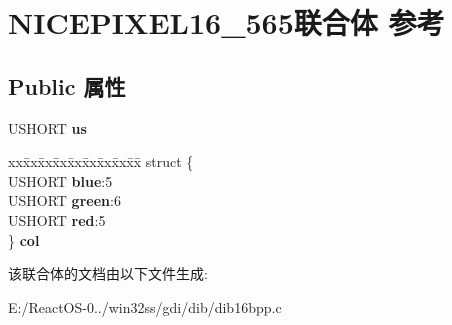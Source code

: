 \hypertarget{union_n_i_c_e_p_i_x_e_l16__565}{}\section{N\+I\+C\+E\+P\+I\+X\+E\+L16\+\_\+565联合体 参考}
\label{union_n_i_c_e_p_i_x_e_l16__565}
\subsection*{Public 属性}
\begin{DoxyCompactItemize}
\item 
\mbox{\label{union_n_i_c_e_p_i_x_e_l16__565_ac82d3017de59cd7a8bbcac3c68549e73}} 
U\+S\+H\+O\+RT {\bfseries us}
\item 
\mbox{\label{union_n_i_c_e_p_i_x_e_l16__565_a875b4cc5156e71ec103db30b4d67b190}} 
\begin{tabbing}
xx\=xx\=xx\=xx\=xx\=xx\=xx\=xx\=xx\=\kill
struct \{\\
\>USHORT {\bfseries blue}:5\\
\>USHORT {\bfseries green}:6\\
\>USHORT {\bfseries red}:5\\
\} {\bfseries col}\\

\end{tabbing}\end{DoxyCompactItemize}


该联合体的文档由以下文件生成\+:\begin{DoxyCompactItemize}
\item 
E\+:/\+React\+O\+S-\/0../win32ss/gdi/dib/dib16bpp.\+c\end{DoxyCompactItemize}

